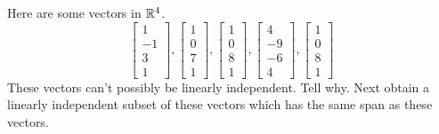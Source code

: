\documentclass{ximera}
\begin{document}
\begin{problem}\label{prb:3.33} Here are some vectors in $\mathbb{R}^{4}$.
\begin{equation*}
\left[
\begin{array}{r}
1 \\
-1 \\
3 \\
1
\end{array}
\right] ,\left[
\begin{array}{r}
1 \\
0 \\
7 \\
1
\end{array}
\right] ,\left[
\begin{array}{r}
1 \\
0 \\
8 \\
1
\end{array}
\right] ,\left[
\begin{array}{r}
4 \\
-9 \\
-6 \\
4
\end{array}
\right] ,\left[
\begin{array}{r}
1 \\
0 \\
8 \\
1
\end{array}
\right]
\end{equation*}
These vectors can't possibly be linearly independent. Tell why. Next obtain a
linearly independent subset of these vectors which has the same span as
these vectors. 
\end{problem}
\end{document}
